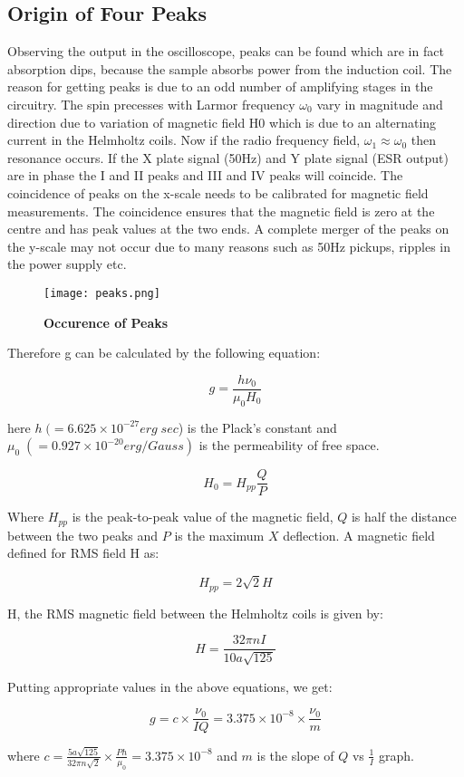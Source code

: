 	\subsection{Origin of Four Peaks}
		Observing the output in the oscilloscope, peaks can be found which are in fact absorption dips, because the sample absorbs power from the induction coil. The reason for getting peaks is due to an odd number of amplifying stages in the circuitry. The spin precesses with Larmor frequency $\omega_0$ vary in magnitude and direction due to variation of magnetic field H0 which is due to an alternating current in the Helmholtz coils. Now if the radio frequency field, $\omega_1 \approx \omega_0$ then resonance occurs. If the X plate signal (50Hz) and Y plate signal (ESR output) are in phase the I and II peaks and III and IV peaks will coincide. The coincidence of peaks on the x-scale needs to be calibrated for magnetic field measurements. The coincidence ensures that the magnetic field is zero at the centre and has peak values at the two ends. A complete merger of the peaks on the y-scale may not occur due to many reasons such as 50Hz pickups, ripples in the power supply etc.

		\begin{figure}[H]
			\centering
			\texttt{[image: peaks.png]}
			\caption{\textbf{Occurence of Peaks}}
			\label{fig:4}
		\end{figure}

		Therefore g can be calculated by the following equation:

		$$g = \frac{h\nu_0}{\mu_0 H_0}$$

		here $h\;(=6.625\times 10^{-27} erg\;sec$) is the Plack's constant and $\mu_0\;(=0.927\times 10^{-20} erg/Gauss)$ is the permeability of free space.

		$$H_0 = H_{pp}\frac{Q}{P}$$

		Where $H_{pp}$ is the peak-to-peak value of the magnetic field, $Q$ is half the distance between the two peaks and $P$ is the maximum $X$ deflection. A magnetic field defined for RMS field H as:

		$$H_{pp} = 2\sqrt{2}H$$

		H, the RMS magnetic field between the Helmholtz coils is given by:

		$$H = \frac{32\pi nI}{10a\sqrt{125}}$$

		Putting appropriate values in the above equations, we get:

		\begin{equation}
			g = c\times \frac{\nu_0}{IQ} = 3.375\times 10^{-8} \times \frac{\nu_0}{m}
			\label{eq:1}
		\end{equation}

		where $c = \frac{5a\sqrt{125}}{32\pi n \sqrt{2}}\times\frac{Ph}{\mu_0} = 3.375\times 10^{-8}$ and $m$ is the slope of $Q$ vs $\frac{1}{I}$ graph.
